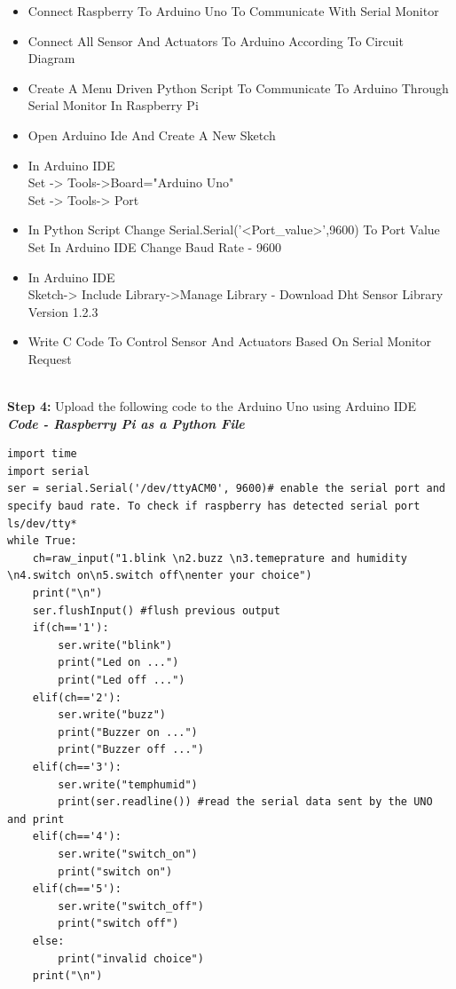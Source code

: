 \documentclass[12pt,a4paper]{article}
\begin{document}
\begin{flushleft}
\begin{itemize}[noitemsep,nolistsep]
\item Connect Raspberry To Arduino Uno To Communicate With Serial Monitor
\item Connect All Sensor And Actuators To Arduino According To Circuit Diagram
\item Create A Menu Driven Python Script To Communicate To Arduino Through Serial Monitor In Raspberry Pi
\item Open Arduino Ide And Create A New Sketch
\item In Arduino IDE
        \\ Set -> Tools->Board="Arduino Uno"
        \\ Set -> Tools-> Port
\item In Python Script
        Change  Serial.Serial('<Port\_value>',9600) To Port Value Set In Arduino IDE
        Change  Baud Rate - 9600
\item In Arduino IDE
         \\ Sketch-> Include Library->Manage Library - Download Dht Sensor Library Version 1.2.3
\item Write C Code To Control Sensor And Actuators Based On Serial Monitor Request

\end{itemize}
\vspace{5mm}
\\

\textbf{Step 4:} Upload the following code to the Arduino Uno using Arduino IDE \\
\vspace{5mm}
\textbf{\textit{Code - Raspberry Pi as a Python File}}
\begin{lstlisting}
import time
import serial
ser = serial.Serial('/dev/ttyACM0', 9600)# enable the serial port and specify baud rate. To check if raspberry has detected serial port ls/dev/tty*
while True:
    ch=raw_input("1.blink \n2.buzz \n3.temeprature and humidity \n4.switch on\n5.switch off\nenter your choice")
    print("\n")
    ser.flushInput() #flush previous output
    if(ch=='1'):
        ser.write("blink")
        print("Led on ...")
        print("Led off ...")
    elif(ch=='2'):  
        ser.write("buzz")
        print("Buzzer on ...")
        print("Buzzer off ...")
    elif(ch=='3'):
        ser.write("temphumid")
        print(ser.readline()) #read the serial data sent by the UNO and print       
    elif(ch=='4'):
        ser.write("switch_on")
        print("switch on")
    elif(ch=='5'):
        ser.write("switch_off")
        print("switch off")
    else:
        print("invalid choice")
    print("\n")
\end{lstlisting}


\end{flushleft}
\end{document}
